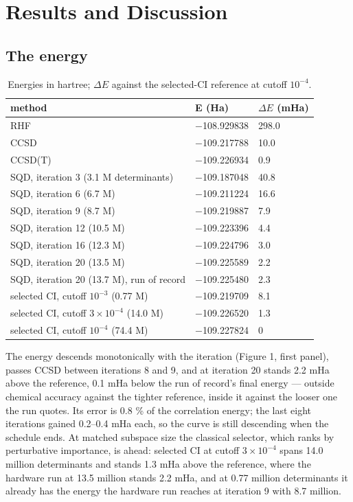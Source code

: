 \documentclass[11pt]{article}
\begin{document}
\section{Results and Discussion}\label{sec:3}


\subsection{The energy}\label{sec:3.1}



\begin{table}[htbp]
\centering
\caption{Energies in hartree; $\Delta E$ against the selected-CI reference at cutoff $10^{-4}$.}\label{tab:2}
\footnotesize
\renewcommand{\arraystretch}{1.15}

\begin{tabularx}{\linewidth}{@{}>{\hsize=1.000\hsize\raggedright\arraybackslash}Xll@{}}
\toprule
method & E (Ha) & $\Delta E$ (mHa) \\
\midrule
RHF & $-$108.929838 & 298.0 \\
CCSD & $-$109.217788 & 10.0 \\
CCSD(T) & $-$109.226934 & 0.9 \\
SQD, iteration 3 (3.1 M determinants) & $-$109.187048 & 40.8 \\
SQD, iteration 6 (6.7 M) & $-$109.211224 & 16.6 \\
SQD, iteration 9 (8.7 M) & $-$109.219887 & 7.9 \\
SQD, iteration 12 (10.5 M) & $-$109.223396 & 4.4 \\
SQD, iteration 16 (12.3 M) & $-$109.224796 & 3.0 \\
SQD, iteration 20 (13.5 M) & $-$109.225589 & 2.2 \\
SQD, iteration 20 (13.7 M), run of record & $-$109.225480 & 2.3 \\
selected CI, cutoff $10^{-3}$ (0.77 M) & $-$109.219709 & 8.1 \\
selected CI, cutoff $3\times10^{-4}$ (14.0 M) & $-$109.226520 & 1.3 \\
selected CI, cutoff $10^{-4}$ (74.4 M) & $-$109.227824 & 0 \\
\bottomrule
\end{tabularx}
\end{table}


The energy descends monotonically with the iteration (Figure 1, first panel), passes CCSD between iterations 8 and 9, and at iteration 20 stands 2.2 mHa above the reference, 0.1 mHa below the run of record's final energy --- outside chemical accuracy against the tighter reference, inside it against the looser one the run quotes. Its error is 0.8 \% of the correlation energy; the last eight iterations gained 0.2--0.4 mHa each, so the curve is still descending when the schedule ends. At matched subspace size the classical selector, which ranks by perturbative importance, is ahead: selected CI at cutoff $3\times10^{-4}$ spans 14.0 million determinants and stands 1.3 mHa above the reference, where the hardware run at 13.5 million stands 2.2 mHa, and at 0.77 million determinants it already has the energy the hardware run reaches at iteration 9 with 8.7 million.
\end{document}
